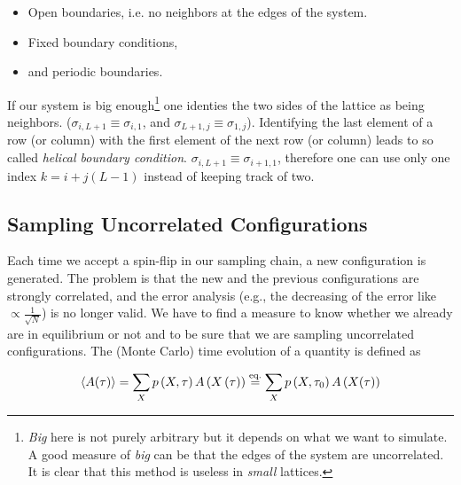 \begin{itemize}
\item Open boundaries, i.e. no neighbors at the edges of the system.
\item Fixed boundary conditions,
\item and periodic boundaries.
\end{itemize}

If our system is big enough\footnote{\emph{Big} here is not purely arbitrary but it depends on what we want to simulate. A good measure of \emph{big} can be that the edges of the system are uncorrelated. It is clear that this method is useless in \emph{small} lattices.} one identies the two sides of the lattice as being neighbors. ($\sigma_{i,L+1}\equiv\sigma_{i,1}$, and $\sigma_{L+1,j}\equiv\sigma_{1,j}$). Identifying the last element of a row (or column) with the first element of the next row (or column) leads to so called \emph{helical boundary condition}. $\sigma_{i,L+1}\equiv\sigma_{i+1,1}$, therefore one can use only one index $k = i+j(L-1)$ instead of keeping track of two.



\subsection{Sampling Uncorrelated Configurations}
Each time we accept a spin-flip in our sampling chain, a new configuration is generated. The problem is that the new and the previous configurations are strongly correlated, and the error analysis (e.g., the decreasing of the error like $\propto \frac{1}{\sqrt{N}}$) is no longer valid. We have to find a measure to know whether we already are in equilibrium or not and to be sure that we are sampling uncorrelated configurations. The (Monte Carlo) time evolution of a quantity is defined as

\begin{equation}
\left<A(\tau)\right>= \sum_X{p\left(X,\tau\right)A\left(X\left(\tau\right)\right)} \overset{\text{eq.}}{=} \sum_X{p\left(X,\tau_0\right)A\left(X(\tau)\right)}
\end{equation} 





